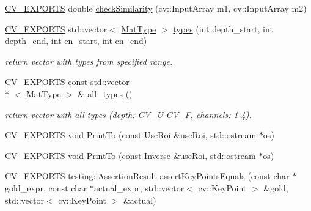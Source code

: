 \begin{DoxyCompactItemize}
\item 
\hyperlink{core_2types__c_8h_a1bf9f0e121b54272da02379cfccd0a2b}{C\-V\-\_\-\-E\-X\-P\-O\-R\-T\-S} double \hyperlink{namespacecvtest_a4cc42c7e95bcddc013cd3a5ada8071bd}{check\-Similarity} (cv\-::\-Input\-Array m1, cv\-::\-Input\-Array m2)
\item 
\hyperlink{core_2types__c_8h_a1bf9f0e121b54272da02379cfccd0a2b}{C\-V\-\_\-\-E\-X\-P\-O\-R\-T\-S} std\-::vector$<$ \hyperlink{classperf_1_1MatType}{Mat\-Type} $>$ \hyperlink{namespacecvtest_afa1b01409165231a61684009dad82ee4}{types} (int depth\-\_\-start, int depth\-\_\-end, int cn\-\_\-start, int cn\-\_\-end)
\begin{DoxyCompactList}\small\item\em return vector with types from specified range. \end{DoxyCompactList}\item 
\hyperlink{core_2types__c_8h_a1bf9f0e121b54272da02379cfccd0a2b}{C\-V\-\_\-\-E\-X\-P\-O\-R\-T\-S} const std\-::vector\\*
$<$ \hyperlink{classperf_1_1MatType}{Mat\-Type} $>$ \& \hyperlink{namespacecvtest_ade018e0613b17d05c275510815622f80}{all\-\_\-types} ()
\begin{DoxyCompactList}\small\item\em return vector with all types (depth\-: C\-V\-\_\-U-\/\-C\-V\-\_\-F, channels\-: 1-\/4). \end{DoxyCompactList}\item 
\hyperlink{core_2types__c_8h_a1bf9f0e121b54272da02379cfccd0a2b}{C\-V\-\_\-\-E\-X\-P\-O\-R\-T\-S} \hyperlink{legacy_8hpp_a8bb47f092d473522721002c86c13b94e}{void} \hyperlink{namespacecvtest_a7b5f91689f87845d2eb78fe213bd2ad6}{Print\-To} (const \hyperlink{classcvtest_1_1UseRoi}{Use\-Roi} \&use\-Roi, std\-::ostream $\ast$os)
\item 
\hyperlink{core_2types__c_8h_a1bf9f0e121b54272da02379cfccd0a2b}{C\-V\-\_\-\-E\-X\-P\-O\-R\-T\-S} \hyperlink{legacy_8hpp_a8bb47f092d473522721002c86c13b94e}{void} \hyperlink{namespacecvtest_a7338785aeee089758774e3eb5d1728d4}{Print\-To} (const \hyperlink{classcvtest_1_1Inverse}{Inverse} \&use\-Roi, std\-::ostream $\ast$os)
\item 
\hyperlink{core_2types__c_8h_a1bf9f0e121b54272da02379cfccd0a2b}{C\-V\-\_\-\-E\-X\-P\-O\-R\-T\-S} \hyperlink{classtesting_1_1AssertionResult}{testing\-::\-Assertion\-Result} \hyperlink{namespacecvtest_a095e7a087f1b85db0dc0ba18c542ef0b}{assert\-Key\-Points\-Equals} (const char $\ast$gold\-\_\-expr, const char $\ast$actual\-\_\-expr, std\-::vector$<$ cv\-::\-Key\-Point $>$ \&gold, std\-::vector$<$ cv\-::\-Key\-Point $>$ \&actual)

\end{DoxyCompactItemize}
